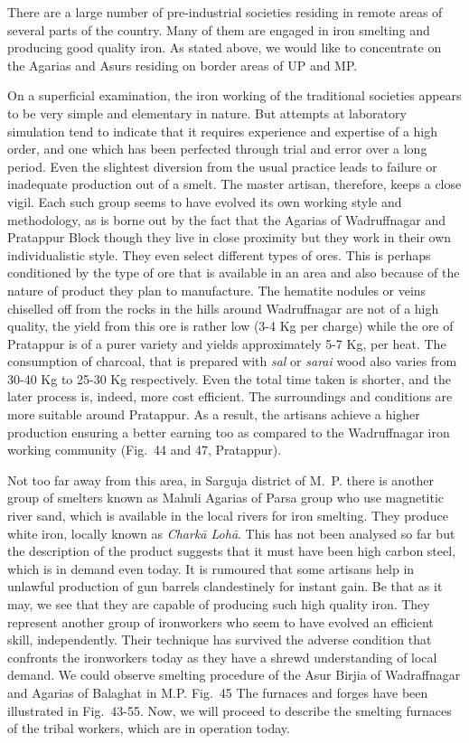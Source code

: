 There are a large number of pre-industrial societies residing in remote areas of several parts of the country. Many of them are engaged in iron smelting and producing good quality iron. As stated above, we would like to concentrate on the Agarias and Asurs residing on border areas of UP and MP. 

On a superficial examination, the iron working of the traditional societies appears to be very simple and elementary in nature. But attempts at laboratory simulation tend to indicate that it requires experience and expertise of a high order, and one which has been perfected through trial and error over a long period. Even the slightest diversion from the usual practice leads to failure or inadequate production out of a smelt. The master artisan, therefore, keeps a close vigil. Each such group seems to have evolved its own working style and methodology, as is borne out by the fact that the Agarias of Wadruffnagar and Pratappur Block though they live in close proximity but they work in their own individualistic style. They even select different types of ores. This is perhaps conditioned by the type of ore that is available in an area and also because of the nature of product they plan to manufacture. The hematite nodules or veins chiselled off from the rocks in the hills around Wadruffnagar are not of a high quality, the yield from this ore is rather low (3-4 Kg per charge) while the ore of Pratappur is of a purer variety and yields approximately 5-7 Kg, per heat. The consumption of charcoal, that is prepared with {\it sal} or {\it sarai} wood also varies from 30-40 Kg to 25-30 Kg respectively. Even the total time taken is shorter, and the later process is, indeed, more cost efficient. The surroundings and conditions are more suitable around Pratappur. As a result, the artisans achieve a higher production ensuring a better earning too as compared to the Wadruffnagar iron working community (Fig.~44 and  47, Pratappur).

Not too far away from this area, in Sarguja district of M.~P. there is another group of smelters known as Mahuli Agarias of Parsa group who use magnetitic river sand, which is available in the local rivers for iron smelting. They produce white iron, locally known as {\it Charkā Lohā}. This has not been analysed so far but the description of the product suggests that it must have been high carbon steel, which is in demand even today. It is rumoured that some artisans help in unlawful production of gun barrels clandestinely for instant gain. Be that as it may, we see that they are capable of producing such high quality iron. They represent another group of ironworkers who seem to have evolved an efficient skill, independently. Their technique has survived the adverse condition that confronts the ironworkers today as they have a shrewd understanding of local demand. We could observe smelting procedure of the Asur Birjia of Wadraffnagar and Agarias of Balaghat in M.P. Fig.~45 The furnaces and forges have been illustrated in Fig.~43-55. Now, we will proceed to describe the smelting furnaces of the tribal workers, which are in operation today.

